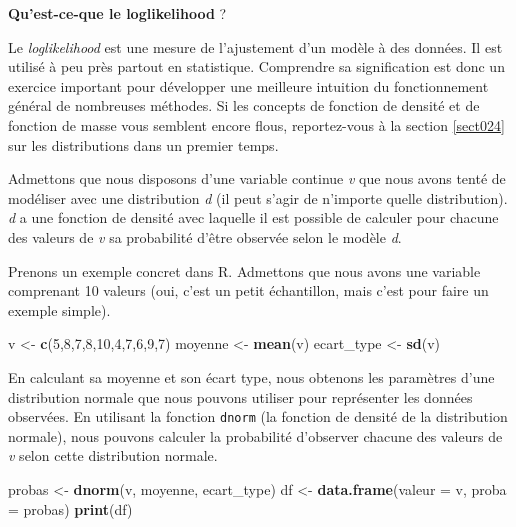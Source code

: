 \documentclass[
  11pt,
  french,
]{book}
\makeatletter
\newenvironment{Shaded}{\begin{snugshade}}{\end{snugshade}}
\newcommand{\DataTypeTok}[1]{\textcolor[rgb]{0.13,0.29,0.53}{#1}}
\newcommand{\DecValTok}[1]{\textcolor[rgb]{0.00,0.00,0.81}{#1}}
\newcommand{\KeywordTok}[1]{\textcolor[rgb]{0.13,0.29,0.53}{\textbf{#1}}}
\newcommand{\NormalTok}[1]{#1}
\newcommand{\StringTok}[1]{\textcolor[rgb]{0.31,0.60,0.02}{#1}}
\newenvironment{kframe}{%
\medskip{}
\setlength{\fboxsep}{.8em}
 \def\at@end@of@kframe{}%
 \ifinner\ifhmode%
  \def\at@end@of@kframe{\end{minipage}}%
  \begin{minipage}{\columnwidth}%
 \fi\fi%
 \def\FrameCommand##1{\hskip\@totalleftmargin \hskip-\fboxsep
 \colorbox{shadecolor}{##1}\hskip-\fboxsep
     \hskip-\linewidth \hskip-\@totalleftmargin \hskip\columnwidth}%
 \MakeFramed {\advance\hsize-\width
   \@totalleftmargin\z@ \linewidth\hsize
   \@setminipage}}%
 {\par\unskip\endMakeFramed%
 \at@end@of@kframe}
\newenvironment{kframev}{%
\medskip{}
\setlength{\fboxsep}{.8em}
 \def\at@end@of@kframev{}%
 \ifinner\ifhmode%
  \def\at@end@of@kframev{\end{minipage}}%
  \begin{minipage}{\columnwidth}%
 \fi\fi%
 \def\FrameCommand##1{\hskip\@totalleftmargin \hskip-\fboxsep
 \colorbox{shadebluecolor}{##1}\hskip-\fboxsep
     \hskip-\linewidth \hskip-\@totalleftmargin \hskip\columnwidth}%
 \MakeFramed {\advance\hsize-\width
   \@totalleftmargin\z@ \linewidth\hsize
   \@setminipage}}%
 {\par\unskip\endMakeFramed%
 \at@end@of@kframev}
\renewenvironment{Shaded}{\begin{kframe}}{\end{kframe}}
\newenvironment{rmdblock}[1]
  {
  \begin{itemize}
  \renewcommand{\labelitemi}{
    \raisebox{-.7\height}[0pt][0pt]{
      {\setkeys{Gin}{width=3em,keepaspectratio}\texttt{[image: images/\#1]}}
    }
  }
  \setlength{\fboxsep}{1em}
  \begin{kframev}
  \small
  \item
  }
  {
  \end{kframev}
  \end{itemize}
  }
\newenvironment{bloc_aller_loin}
  {\begin{rmdblock}{aller_loin}}
  {\end{rmdblock}}
\makeatother
\begin{document}
\begin{bloc_aller_loin}

\textbf{Qu'est-ce-que le loglikelihood} ?

Le \emph{loglikelihood} est une mesure de l'ajustement d'un modèle à des données. Il est utilisé à peu près partout en statistique. Comprendre sa signification est donc un exercice important pour développer une meilleure intuition du fonctionnement général de nombreuses méthodes. Si les concepts de fonction de densité et de fonction de masse vous semblent encore flous, reportez-vous à la section \ref{sect024} sur les distributions dans un premier temps.

Admettons que nous disposons d'une variable continue \emph{v} que nous avons tenté de modéliser avec une distribution \emph{d} (il peut s'agir de n'importe quelle distribution). \emph{d} a une fonction de densité avec laquelle il est possible de calculer pour chacune des valeurs de \emph{v} sa probabilité d'être observée selon le modèle \emph{d}.

Prenons un exemple concret dans R. Admettons que nous avons une variable comprenant 10 valeurs (oui, c'est un petit échantillon, mais c'est pour faire un exemple simple).

\begin{Shaded}
\begin{Highlighting}[]
\NormalTok{v <-}\StringTok{ }\KeywordTok{c}\NormalTok{(}\DecValTok{5}\NormalTok{,}\DecValTok{8}\NormalTok{,}\DecValTok{7}\NormalTok{,}\DecValTok{8}\NormalTok{,}\DecValTok{10}\NormalTok{,}\DecValTok{4}\NormalTok{,}\DecValTok{7}\NormalTok{,}\DecValTok{6}\NormalTok{,}\DecValTok{9}\NormalTok{,}\DecValTok{7}\NormalTok{)}
\NormalTok{moyenne <-}\StringTok{ }\KeywordTok{mean}\NormalTok{(v)}
\NormalTok{ecart_type <-}\StringTok{ }\KeywordTok{sd}\NormalTok{(v)}
\end{Highlighting}
\end{Shaded}

En calculant sa moyenne et son écart type, nous obtenons les paramètres d'une distribution normale que nous pouvons utiliser pour représenter les données observées. En utilisant la fonction \texttt{dnorm} (la fonction de densité de la distribution normale), nous pouvons calculer la probabilité d'observer chacune des valeurs de \emph{v} selon cette distribution normale.

\begin{Shaded}
\begin{Highlighting}[]
\NormalTok{probas <-}\StringTok{ }\KeywordTok{dnorm}\NormalTok{(v, moyenne, ecart_type)}
\NormalTok{df <-}\StringTok{ }\KeywordTok{data.frame}\NormalTok{(}\DataTypeTok{valeur =}\NormalTok{ v,}
                 \DataTypeTok{proba =}\NormalTok{ probas)}
\KeywordTok{print}\NormalTok{(df)}
\end{Highlighting}
\end{Shaded}


\end{bloc_aller_loin}
\end{document}
